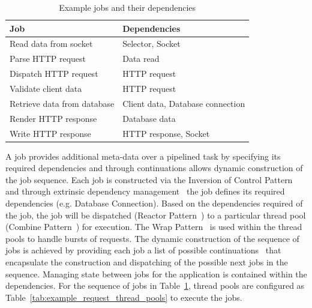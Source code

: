 \documentclass[conference]{ieee/IEEEtran}
\begin{document}
\begin{table}[!t]
\renewcommand{\arraystretch}{1.3}
\caption{Example jobs and their dependencies}
\label{tab:example_request_jobs}
\centering
\begin{tabular}{l||l}
\hline
\bfseries Job & \bfseries Dependencies \\
\hline\hline
Read data from socket & Selector, Socket \\
\hline
Parse HTTP request & Data read \\
\hline
Dispatch HTTP request & HTTP request \\
\hline
Validate client data & HTTP request \\
\hline
Retrieve data from database & Client data, Database connection \\
\hline
Render HTTP response & Database data \\
\hline
Write HTTP response & HTTP response, Socket \\
\hline
\end{tabular}
\end{table}

A job provides additional meta-data over a pipelined task by specifying its
required dependencies and through continuations allows dynamic construction of
the job sequence.  Each job is constructed via the Inversion of Control Pattern
and through extrinsic dependency management~\cite{ioc} the job defines its
required dependencies (e.g. Database Connection).  Based on the dependencies
required of the job, the job will be dispatched (Reactor Pattern~\cite{reactor})
to a particular thread pool (Combine Pattern~\cite{pipeline}) for execution. 
The Wrap Pattern~\cite{pipeline} is used within the thread pools to handle
bursts of requests.  The dynamic construction of the sequence of jobs is
achieved by providing each job a list of possible
continuations~\cite{continuations} that encapsulate the construction and
dispatching of the possible next jobs in the sequence. Managing state between
jobs for the application is contained within the dependencies.  For the sequence
of jobs in Table~\ref{tab:example_request_jobs}, thread pools are configured as
Table~\ref{tab:example_request_thread_pools} to execute the jobs.
\end{document}
